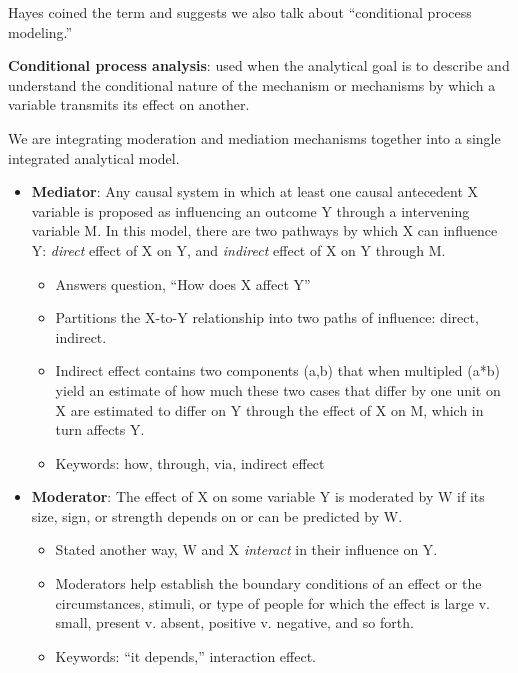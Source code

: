 \documentclass[
  11pt,
]{book}
\providecommand{\tightlist}{%
  \setlength{\itemsep}{0pt}\setlength{\parskip}{0pt}}
\begin{document}
Hayes \citeyearpar{hayes_introduction_2018} coined the term and suggests we also talk about ``conditional process modeling.''

\textbf{Conditional process analysis}: used when the analytical goal is to describe and understand the conditional nature of the mechanism or mechanisms by which a variable transmits its effect on another.

We are integrating moderation and mediation mechanisms together into a single integrated analytical model.

\begin{itemize}
\tightlist
\item
  \textbf{Mediator}: Any causal system in which at least one causal antecedent X variable is proposed as influencing an outcome Y through a intervening variable M. In this model, there are two pathways by which X can influence Y: \emph{direct} effect of X on Y, and \emph{indirect} effect of X on Y through M.

  \begin{itemize}
  \tightlist
  \item
    Answers question, ``How does X affect Y''
  \item
    Partitions the X-to-Y relationship into two paths of influence: direct, indirect.
  \item
    Indirect effect contains two components (a,b) that when multipled (a*b) yield an estimate of how much these two cases that differ by one unit on X are estimated to differ on Y through the effect of X on M, which in turn affects Y.
  \item
    Keywords: how, through, via, indirect effect
  \end{itemize}
\item
  \textbf{Moderator}: The effect of X on some variable Y is moderated by W if its size, sign, or strength depends on or can be predicted by W.

  \begin{itemize}
  \tightlist
  \item
    Stated another way, W and X \emph{interact} in their influence on Y.\\
  \item
    Moderators help establish the boundary conditions of an effect or the circumstances, stimuli, or type of people for which the effect is large v. small, present v. absent, positive v. negative, and so forth.
  \item
    Keywords: ``it depends,'' interaction effect.
  \end{itemize}
\end{itemize}
\end{document}
